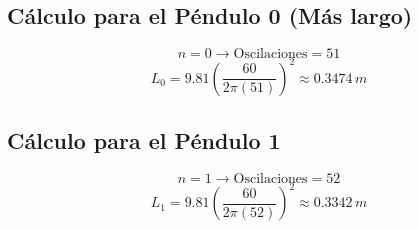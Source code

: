 \documentclass[12pt, a4paper]{article}
\begin{document}
	\subsection*{Cálculo para el Péndulo 0 (Más largo)}
	$$ n = 0 \rightarrow \text{Oscilaciones} = 51 $$
	$$ L_0 = 9.81 \left( \frac{60}{2\pi (51)} \right)^2 \approx 0.3474 \, m $$
	
	\subsection*{Cálculo para el Péndulo 1}
	$$ n = 1 \rightarrow \text{Oscilaciones} = 52 $$
	$$ L_1 = 9.81 \left( \frac{60}{2\pi (52)} \right)^2 \approx 0.3342 \, m $$
	

	
\end{document}
